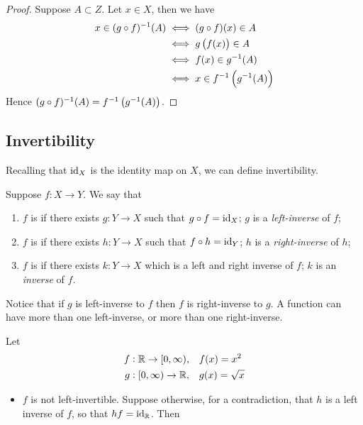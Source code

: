 \begin{proof}
Suppose $A\subset Z$. Let $x\in X$, then we have
\begin{align*}
x\in(g\circ f)^{-1}(A)
&\iff (g\circ f)(x)\in A\\
&\iff g\left(f(x)\right)\in A\\
&\iff f(x)\in g^{-1}(A)\\
&\iff x\in f^{-1}\left(g^{-1}(A)\right)
\end{align*}
Hence $(g\circ f)^{-1}(A)=f^{-1}\left(g^{-1}(A)\right)$.
\end{proof}

\subsection{Invertibility}
Recalling that $\operatorname{id}_X$ is the identity map on $X$, we can define invertibility.

\begin{definition}[Invertibility]
Suppose $f:X\to Y$. We say that
\begin{enumerate}[label=(\roman*)]
\item $f$ is  if there exists $g:Y\to X$ such that $g\circ f=\operatorname{id}_X$; $g$ is a \emph{left-inverse} of $f$;
\item $f$ is  if there exists $h:Y\to X$ such that $f\circ h=\operatorname{id}_Y$; $h$ is a \emph{right-inverse} of $h$;
\item $f$ is  if there exists $k:Y\to X$ which is a left and right inverse of $f$; $k$ is an \emph{inverse} of $f$.
\end{enumerate}
\end{definition}

\begin{remark}
Notice that if $g$ is left-inverse to $f$ then $f$ is right-inverse to $g$. A function can have more than one left-inverse, or more than one right-inverse.
\end{remark}

\begin{example}
Let
\begin{align*}
f:\mathbb R\to[0,\infty),&\quad f(x)=x^2\\
g:[0,\infty)\to\mathbb R,&\quad g(x)=\sqrt{x}
\end{align*}
\begin{itemize}
\item $f$ is not left-invertible. Suppose otherwise, for a contradiction, that $h$ is a left inverse of $f$, so that $hf=\operatorname{id}_\mathbb R$. Then 
\end{itemize}
\end{example}

